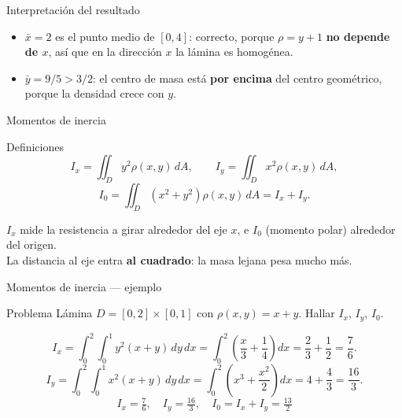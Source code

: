 \documentclass[11pt,aspectratio=169]{beamer}
\begin{document}
\begin{frame}{Interpretación del resultado}
  \begin{itemize}
    \item $\bar x = 2$ es el punto medio de $[0,4]$: correcto, porque $\rho=y+1$ \textbf{no depende de $x$}, así que en la dirección $x$ la lámina es homogénea.
    \pause
    \item $\bar y = 9/5 > 3/2$: el centro de masa está \textbf{por encima} del centro geométrico, porque la densidad crece con $y$.
  \end{itemize}
  \vspace{10pt}
  \pause
\end{frame}

\begin{frame}{Momentos de inercia}
  \begin{block}{Definiciones}
    \[
      I_x=\iint_D y^2\rho(x,y)\,dA,\qquad
      I_y=\iint_D x^2\rho(x,y)\,dA,
    \]
    \[
      I_0=\iint_D (x^2+y^2)\rho(x,y)\,dA = I_x+I_y.
    \]
  \end{block}
  \pause
  \vspace{4pt}
  \begin{center}
  \small\color{gray60}
  $I_x$ mide la resistencia a girar alrededor del eje $x$, e $I_0$ (momento polar) alrededor del origen.\\
  La distancia al eje entra \textbf{al cuadrado}: la masa lejana pesa mucho más.
  \end{center}
\end{frame}

\begin{frame}{Momentos de inercia --- ejemplo}
  \begin{block}{Problema}
    Lámina $D=[0,2]\times[0,1]$ con $\rho(x,y)=x+y$. Hallar $I_x$, $I_y$, $I_0$.
  \end{block}
  \pause
  \[
    I_x=\int_0^2\!\!\int_0^1 y^2(x+y)\,dy\,dx
    =\int_0^2\left(\frac{x}{3}+\frac14\right)dx
    =\frac23+\frac12 = \frac76.
  \]
  \pause
  \[
    I_y=\int_0^2\!\!\int_0^1 x^2(x+y)\,dy\,dx
    =\int_0^2\left(x^3+\frac{x^2}{2}\right)dx
    = 4+\frac43 = \frac{16}{3}.
  \]
  \pause
  \[
    \boxed{I_x=\tfrac76,\quad I_y=\tfrac{16}{3},\quad I_0=I_x+I_y=\tfrac{13}{2}}
  \]
\end{frame}
\end{document}
